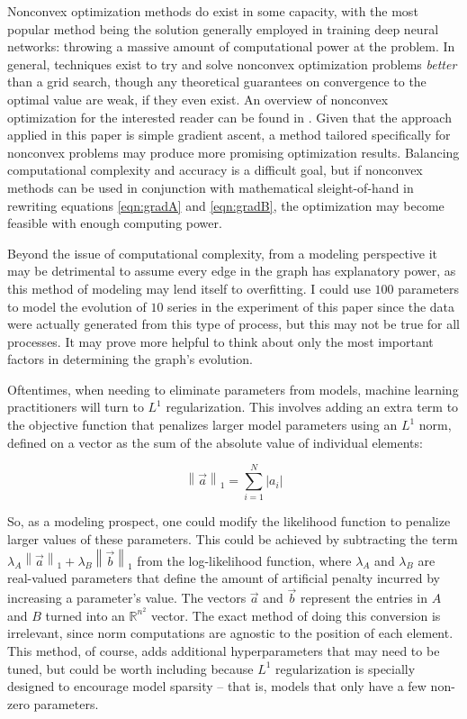 \documentclass[12pt]{article}
\theoremstyle{definition}
\newcommand{\norm}[1]{\left\lVert#1\right\rVert}
\begin{document}
Nonconvex optimization methods do exist in some capacity, with the most popular method being the solution generally employed in training deep neural networks: throwing a massive amount of computational power at the problem. In general, techniques exist to try and solve nonconvex optimization problems \textit{better} than a grid search, though any theoretical guarantees on convergence to the optimal value are weak, if they even exist. An overview of nonconvex optimization for the interested reader can be found in \cite{JainNonConvexOptimization}. Given that the approach applied in this paper is simple gradient ascent, a method tailored specifically for nonconvex problems may produce more promising optimization results. Balancing computational complexity and accuracy is a difficult goal, but if nonconvex methods can be used in conjunction with mathematical sleight-of-hand in rewriting equations \ref{eqn:gradA} and \ref{eqn:gradB}, the optimization may become feasible with enough computing power. 

Beyond the issue of computational complexity, from a modeling perspective it may be detrimental to assume every edge in the graph has explanatory power, as this method of modeling may lend itself to overfitting. I could use $100$ parameters to model the evolution of $10$ series in the experiment of this paper since the data were actually generated from this type of process, but this may not be true for all processes. It may prove more helpful to think about only the most important factors in determining the graph's evolution.

Oftentimes, when needing to eliminate parameters from models, machine learning practitioners will turn to $L^1$ regularization. This involves adding an extra term to the objective function that penalizes larger model parameters using an $L^1$ norm, defined on a vector as the sum of the absolute value of individual elements:

\begin{equation}
    \label{eqn:normL1}
    \norm{\vec{a}}_1 = \sum_{i=1}^N |a_i|
\end{equation}

So, as a modeling prospect, one could modify the likelihood function to penalize larger values of these parameters. This could be achieved by subtracting the term $\lambda_A \norm{\vec{a}}_1 + \lambda_B \norm{\vec{b}}_1$ from the log-likelihood function, where $\lambda_A$ and $\lambda_B$ are real-valued parameters that define the amount of artificial penalty incurred by increasing a parameter's value. The vectors $\vec{a}$ and $\vec{b}$ represent the entries in $A$ and $B$ turned into an $\mathbb{R}^{n^2}$ vector. The exact method of doing this conversion is irrelevant, since norm computations are agnostic to the position of each element. This method, of course, adds additional hyperparameters that may need to be tuned, but could be worth including because $L^1$ regularization is specially designed to encourage model sparsity -- that is, models that only have a few non-zero parameters.
\end{document}
